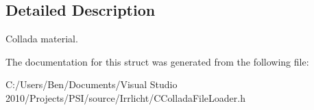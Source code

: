 \subsection{Detailed Description}
Collada material. 

The documentation for this struct was generated from the following file\-:\begin{DoxyCompactItemize}
\item 
C\-:/\-Users/\-Ben/\-Documents/\-Visual Studio 2010/\-Projects/\-P\-S\-I/source/\-Irrlicht/C\-Collada\-File\-Loader.\-h\end{DoxyCompactItemize}
